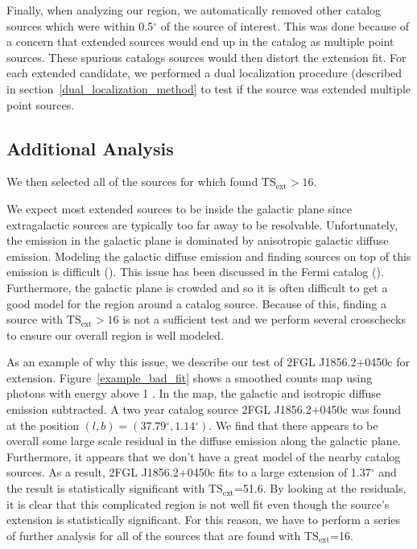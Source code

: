 \documentclass[12pt,preprint]{aastex}
\newcommand{\gev}{\text{GeV}\xspace}
\newcommand{\tsext}{{\ensuremath{\text{TS}_\text{ext}}}\xspace}
\renewcommand{\deg}{\ensuremath{^\circ}\xspace}
\newcommand{\pointlike}{\text{\em pointlike}\xspace}
\begin{document}
Finally, when analyzing our region, we automatically removed other
catalog sources which were within 0.5\deg of the source of interest. This was done because of
a concern that extended sources would end up in the catalog as
multiple point sources. These spurious catalogs sources would then
distort the extension fit.
For each extended candidate, we performed a dual localization procedure
(described in section~\ref{dual_localization_method} to test if the
source was extended multiple point sources.


\subsection{Additional Analysis}

We then selected all of the
sources for which \pointlike found $\tsext>16$.

We expect most extended sources to be inside the galactic plane
since extragalactic sources are typically too far away to be
resolvable. Unfortunately, the \gev emission in the galactic plane
is dominated by anisotropic galactic diffuse emission.  Modeling the
galactic diffuse emission and finding sources on top of this emission is
difficult (\cite{first_diffuse_paper}). This issue has been discussed in the
Fermi catalog (\cite{first_cat,second_cat}). Furthermore, the galactic plane is
crowded and so it is often difficult to get a good model for the
region around a catalog source.  Because of this, finding a source with
$\tsext>16$ is not a sufficient test and we perform several crosschecks
to ensure our overall region is well modeled.

As an example of why this issue, we describe our test of 2FGL
J1856.2+0450c for extension.  Figure~\ref{example_bad_fit} shows
a smoothed counts map using photons with energy above 1 \gev. In
the map, the galactic and isotropic diffuse emission subtracted.
A two year catalog source 2FGL J1856.2+0450c was found at the position
$(l,b)=(37.79\deg,1.14\deg)$.  We find that there appears to be overall
some large scale residual in the diffuse emission along the galactic
plane. Furthermore, it appears that we don't have a great model of
the nearby catalog sources. As a result, 2FGL J1856.2+0450c fits to a
large extension of 1.37\deg and the result is statistically significant
with \tsext=51.6.  By looking at the residuals, it is clear that this
complicated region is not well fit even though the source's extension is
statistically significant. For this reason, we have to perform a series
of further analysis for all of the sources that are found with \tsext=16.
\end{document}
